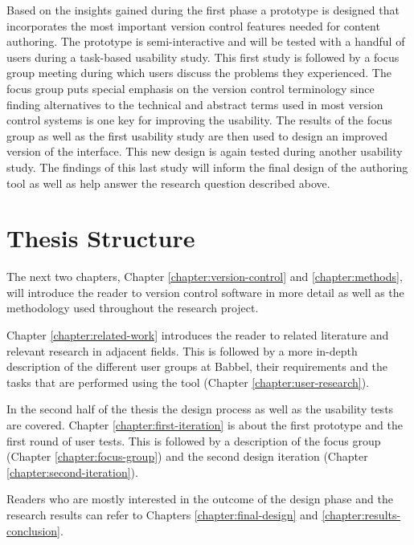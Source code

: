 Based on the insights gained during the first phase a prototype is designed that incorporates the most important version control features needed for content authoring. The prototype is semi-interactive and will be tested with a handful of users during a task-based usability study. This first study is followed by a focus group meeting during which users discuss the problems they experienced. The focus group puts special emphasis on the version control terminology since finding alternatives to the technical and abstract terms used in most version control systems is one key for improving the usability. The results of the focus group as well as the first usability study are then used to design an improved version of the interface. This new design is again tested during another usability study. The findings of this last study will inform the final design of the authoring tool as well as help answer the research question described above.


\section{Thesis Structure}
The next two chapters, Chapter \ref{chapter:version-control} and \ref{chapter:methods}, will introduce the reader to version control software in more detail as well as the methodology used throughout the research project. 

Chapter \ref{chapter:related-work} introduces the reader to related literature and relevant research in adjacent fields. This is followed by a more in-depth description of the different user groups at Babbel, their requirements and the tasks that are performed using the tool (Chapter \ref{chapter:user-research}).

In the second half of the thesis the design process as well as the usability tests are covered. Chapter \ref{chapter:first-iteration} is about the first prototype and the first round of user tests. This is followed by a description of the focus group (Chapter \ref{chapter:focus-group}) and the second design iteration (Chapter \ref{chapter:second-iteration}).

Readers who are mostly interested in the outcome of the design phase and the research results can refer to Chapters \ref{chapter:final-design} and \ref{chapter:results-conclusion}.




